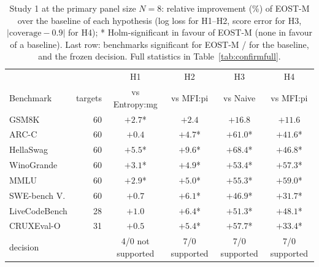 \begin{table}[tbp]
\centering\footnotesize
\caption{Study 1 at the primary panel size $N=8$: relative improvement (\%) of EOST-M over the baseline of each hypothesis (log loss for H1--H2, score error for H3, $|\mathrm{coverage}-0.9|$ for H4); * Holm-significant in favour of EOST-M (none in favour of a baseline). Last row: benchmarks significant for EOST-M / for the baseline, and the frozen decision. Full statistics in Table~\ref{tab:confirmfull}.}
\label{tab:confirm}
\setlength{\tabcolsep}{5pt}
\begin{tabular}{@{}lrcccc@{}}
\toprule
 & & H1 & H2 & H3 & H4 \\
Benchmark & targets & vs Entropy:mg & vs MFI:pi & vs Naive & vs MFI:pi \\
\midrule
GSM8K & 60 & $+2.7$* & $+2.4$ & $+16.8$ & $+11.6$ \\
ARC-C & 60 & $+0.4$ & $+4.7$* & $+61.0$* & $+41.6$* \\
HellaSwag & 60 & $+5.5$* & $+9.6$* & $+68.4$* & $+46.8$* \\
WinoGrande & 60 & $+3.1$* & $+4.9$* & $+53.4$* & $+57.3$* \\
MMLU & 60 & $+2.9$* & $+5.0$* & $+55.3$* & $+59.0$* \\
SWE-bench V. & 60 & $+0.7$ & $+6.1$* & $+46.9$* & $+31.7$* \\
LiveCodeBench & 28 & $+1.0$ & $+6.4$* & $+51.3$* & $+48.1$* \\
CRUXEval-O & 31 & $+0.5$ & $+5.4$* & $+57.7$* & $+33.4$* \\
\midrule
decision & & 4/0 not supported & 7/0 supported & 7/0 supported & 7/0 supported \\
\bottomrule
\end{tabular}
\end{table}
